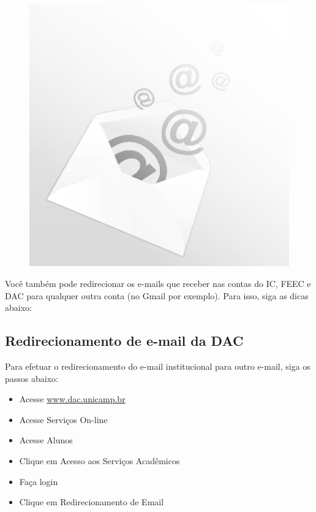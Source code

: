 \begin{figure}[b!]
    \centering
    \includegraphics[scale=0.50, keepaspectratio=true]{img/imgs/14-email_unicamp/-086.jpg}
\end{figure}
Você também pode redirecionar os e-mails que receber nas contas do IC, FEEC
e DAC para qualquer outra conta (no Gmail por exemplo). Para isso, siga as dicas
abaixo:

\subsection{Redirecionamento de e-mail da DAC}

Para efetuar o redirecionamento do e-mail institucional para outro e-mail, siga
os passos abaixo:

\begin{itemize}
\item  Acesse \url{www.dac.unicamp.br}
\item  Acesse Serviços On-line
\item  Acesse Alunos
\item  Clique em Acesso aos Serviços Acadêmicos
\item  Faça login
\item  Clique em Redirecionamento de Email
\end{itemize}

